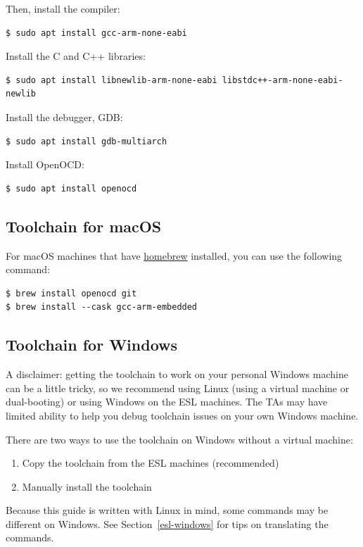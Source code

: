 Then, install the compiler:
%
\begin{verbatim}
$ sudo apt install gcc-arm-none-eabi
\end{verbatim}

Install the C and C++ libraries:
%
\begin{verbatim}
$ sudo apt install libnewlib-arm-none-eabi libstdc++-arm-none-eabi-newlib
\end{verbatim}

Install the debugger, GDB:
%
\begin{verbatim}
$ sudo apt install gdb-multiarch
\end{verbatim}

Install OpenOCD:
%
\begin{verbatim}
$ sudo apt install openocd
\end{verbatim}

\subsection{Toolchain for macOS}

For macOS machines that have \href{https://brew.sh}{homebrew}
installed, you can use the following command:

\begin{verbatim}
$ brew install openocd git
$ brew install --cask gcc-arm-embedded
\end{verbatim}

\subsection{Toolchain for Windows}

A disclaimer: getting the toolchain to work on your personal Windows machine
can be a little tricky, so we recommend using Linux (using a virtual machine
or dual-booting) or using Windows on the ESL machines. The TAs may have
limited ability to help you debug toolchain issues on your own Windows
machine.

There are two ways to use the toolchain on Windows without a virtual machine:
\begin{enumerate}
  \item Copy the toolchain from the ESL machines (recommended)
  \item Manually install the toolchain
\end{enumerate}

Because this guide is written with Linux in mind, some commands may be
different on Windows. See Section~\ref{esl-windows} for tips on translating
the commands.

